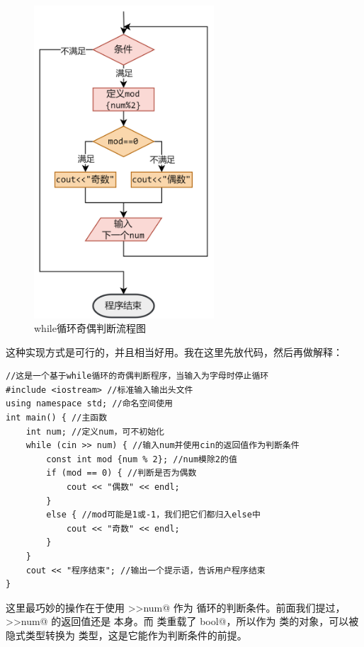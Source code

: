 \begin{figure}[htbp]
    \centering
    \includegraphics[width=0.6\textwidth]{../images/generalized_parts/03_structure_of_odd_or_even_with_while_loop_300.png}
    \caption{while循环奇偶判断流程图}
\end{figure}
这种实现方式是可行的，并且相当好用。我在这里先放代码，然后再做解释：
\begin{lstlisting}[caption=while循环奇偶判断,label=lst:OddOrEvenWithWhileLoop]
//这是一个基于while循环的奇偶判断程序，当输入为字母时停止循环
#include <iostream> //标准输入输出头文件
using namespace std; //命名空间使用
int main() { //主函数
    int num; //定义num，可不初始化
    while (cin >> num) { //输入num并使用cin的返回值作为判断条件
        const int mod {num % 2}; //num模除2的值
        if (mod == 0) { //判断是否为偶数
            cout << "偶数" << endl;
        }
        else { //mod可能是1或-1，我们把它们都归入else中
            cout << "奇数" << endl;
        }
    }
    cout << "程序结束"; //输出一个提示语，告诉用户程序结束
}
\end{lstlisting}
这里最巧妙的操作在于使用 \lstinline@cin>>num@ 作为 \lstinline@while@ 循环的判断条件。前面我们提过，\lstinline@cin>>num@ 的返回值还是 \lstinline@cin@ 本身。而 \lstinline@ostream@ 类重载了 \lstinline@operator bool@，所以作为 \lstinline@ostream@ 类的对象，\lstinline@cin@ 可以被隐式类型转换为 \lstinline@bool@ 类型，这是它能作为判断条件的前提。\par
